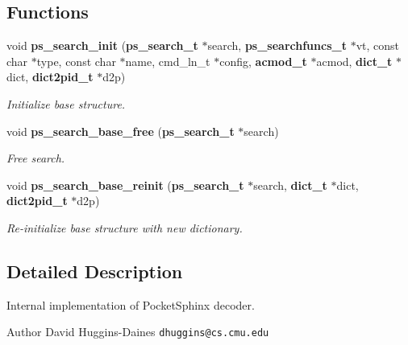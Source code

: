 \subsection*{Functions}
\begin{DoxyCompactItemize}
\item 
void {\bf ps\+\_\+search\+\_\+init} ({\bf ps\+\_\+search\+\_\+t} $\ast$search, {\bf ps\+\_\+searchfuncs\+\_\+t} $\ast$vt, const char $\ast$type, const char $\ast$name, cmd\+\_\+ln\+\_\+t $\ast$config, {\bf acmod\+\_\+t} $\ast$acmod, {\bf dict\+\_\+t} $\ast$dict, {\bf dict2pid\+\_\+t} $\ast$d2p)\label{pocketsphinx__internal_8h_a9e0d66662ea7c64f8bddbbfe57496896}

\begin{DoxyCompactList}\small\item\em Initialize base structure. \end{DoxyCompactList}\item 
void {\bf ps\+\_\+search\+\_\+base\+\_\+free} ({\bf ps\+\_\+search\+\_\+t} $\ast$search)\label{pocketsphinx__internal_8h_a39db3228c813a2943d47ff3f13e6ef08}

\begin{DoxyCompactList}\small\item\em Free search. \end{DoxyCompactList}\item 
void {\bf ps\+\_\+search\+\_\+base\+\_\+reinit} ({\bf ps\+\_\+search\+\_\+t} $\ast$search, {\bf dict\+\_\+t} $\ast$dict, {\bf dict2pid\+\_\+t} $\ast$d2p)\label{pocketsphinx__internal_8h_a307801961f27bd5f4b82a3e6b83e0ca1}

\begin{DoxyCompactList}\small\item\em Re-\/initialize base structure with new dictionary. \end{DoxyCompactList}\end{DoxyCompactItemize}


\subsection{Detailed Description}
Internal implementation of Pocket\+Sphinx decoder. 

\begin{DoxyAuthor}{Author}
David Huggins-\/\+Daines {\tt dhuggins@cs.\+cmu.\+edu} 
\end{DoxyAuthor}
